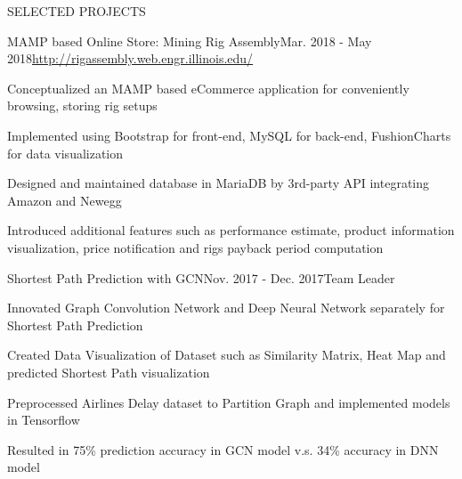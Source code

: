 \documentclass{resume} %
\begin{document}
\begin{rSection}{SELECTED PROJECTS}

\begin{rSubsection}{MAMP based Online Store: Mining Rig Assembly}{Mar. 2018 - May 2018}{\url{http://rigassembly.web.engr.illinois.edu/}}{}
\item Conceptualized an MAMP based eCommerce application for conveniently browsing, storing rig setups 
\item Implemented using Bootstrap for front-end, MySQL for back-end, FushionCharts for data visualization
\item Designed and maintained database in MariaDB by 3rd-party API integrating Amazon and Newegg
\item Introduced additional features such as performance estimate, product information visualization, price notification and rigs payback period computation
\end{rSubsection}


\begin{rSubsection}{Shortest Path Prediction with GCN}{Nov. 2017 - Dec. 2017}{Team Leader}{}
\item Innovated Graph Convolution Network and Deep Neural Network separately for Shortest Path Prediction
\item Created Data Visualization of Dataset such as Similarity Matrix, Heat Map and predicted Shortest Path visualization
\item Preprocessed Airlines Delay dataset to Partition Graph and implemented models in Tensorflow
\item Resulted in 75\% prediction accuracy in GCN model v.s. 34\% accuracy in DNN model
\end{rSubsection}


\end{rSection} 
\end{document}

